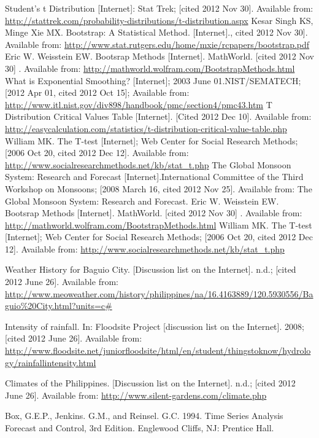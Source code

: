 \begin{thebibliography}{99\kern\bibindent}
 Student's t Distribution [Internet]: Stat Trek; [cited 2012 Nov 30]. Available from: \url{ http://stattrek.com/probability-distributions/t-distribution.aspx}
 Kesar Singh KS, Minge Xie MX.  Bootstrap: A Statistical Method. [Internet]., cited 2012 Nov 30]. Available from: \url{ http://www.stat.rutgers.edu/home/mxie/rcpapers/bootstrap.pdf}
\bibitem Eric W. Weisstein EW. Bootsrap Methods [Internet]. MathWorld. [cited 2012 Nov 30] . Available from: \url{http://mathworld.wolfram.com/BootstrapMethods.html}
 What is Exponential Smoothing? [Internet]; 2003 June 01.NIST/SEMATECH; [2012 Apr 01, cited 2012 Oct 15]; Available from: \url{ http://www.itl.nist.gov/div898/handbook/pmc/section4/pmc43.htm}
 T Distribution Critical Values Table [Internet]. [Cited 2012 Dec 10]. Available from: \url{http://easycalculation.com/statistics/t-distribution-critical-value-table.php}
 William MK. The T-test [Internet]; Web Center for Social Research Methods; [2006 Oct 20, cited 2012 Dec 12]. Available from: \url{ http://www.socialresearchmethods.net/kb/stat_t.php}
 The Global Monsoon System: Research and Forecast [Internet].International Committee of the Third Workshop on Monsoons; [2008 March 16, cited 2012 Nov 25]. Available from: The Global Monsoon System: Research and Forecast.	
 Eric W. Weisstein EW. Bootsrap Methods [Internet]. MathWorld. [cited 2012 Nov 30] . Available from:  \url{http://mathworld.wolfram.com/BootstrapMethods.html}
 William MK. The T-test [Internet]; Web Center for Social Research Methods; [2006 Oct 20, cited 2012 Dec 12]. Available from: \url{http://www.socialresearchmethods.net/kb/stat_t.php}

 Weather History for Baguio City. [Discussion list on the Internet]. n.d.; [cited 2012 June 26]. Available from: \url{http://www.meoweather.com/history/philippines/na/16.4163889/120.5930556/Baguio%20City.html?units=c#}

 Intensity of rainfall. In: Floodsite Project [discussion list on the Internet]. 2008; [cited 2012 June 26]. Available from: \url{http://www.floodsite.net/juniorfloodsite/html/en/student/thingstoknow/hydrology/rainfallintensity.html}

 Climates of the Philippines. [Discussion list on the Internet]. n.d.; [cited 2012 June 26]. Available from: \url{http://www.silent-gardens.com/climate.php}

 Box, G.E.P.,  Jenkins. G.M., and Reinsel. G.C.  1994. Time Series Analysis Forecast and Control, 3rd Edition. Englewood Cliffs, NJ: Prentice Hall.


\end{thebibliography}
